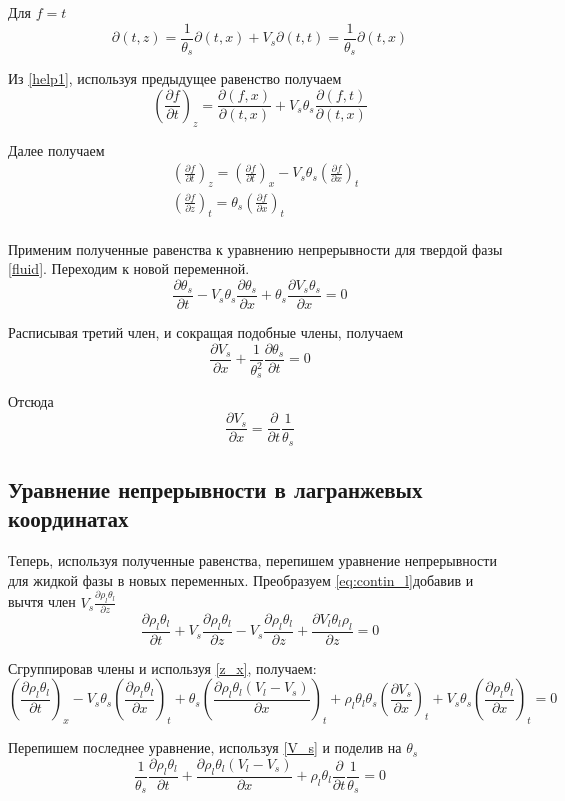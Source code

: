 \documentclass[12pt,a4paper]{article}
\newcommand{\pd}[2]{\frac{\partial #1}{\partial #2}}
\begin{document}
Для $ f = t $ 
$$
\partial(t , z) = \frac{1}{\theta_s} \partial(t , x) + V_s \partial(t , t) = \frac{1}{\theta_s} \partial(t , x)
$$

Из \eqref{help1}, используя предыдущее равенство получаем
$$
\left(\pd{f}{t}\right)_z = \pd{(f , x)}{(t , x)} + V_s \theta_s\pd{(f ,t)}{(t , x)}
$$

Далее получаем
\begin{equation}
\begin{aligned}
&\left(\pd{f}{t}\right)_z = \left(\pd{f}{t}\right)_x - V_s\theta_s\left(\pd{f}{x}\right)_t\\
&\left(\pd{f}{z}\right)_t = \theta_s\left(\pd{f}{x}\right)_t\\
\end{aligned}
\label{z_x}
\end{equation}

Применим полученные равенства к уравнению непрерывности для твердой фазы \eqref{fluid}. Переходим к новой переменной.
$$
\pd{\theta_s}{t} - V_s\theta_s\pd{\theta_s}{x} + \theta_s\pd{V_s\theta_s}{x} =0
$$

Расписывая третий член, и сокращая подобные члены, получаем
$$
\pd{V_s}{x} + \frac{1}{\theta_s^2}\pd{\theta_s}{t} = 0
$$

Отсюда
\begin{equation}
\pd{V_s}{x} = \pd{}{t}\frac{1}{\theta_s}
\label{V_s}
\end{equation}

\subsection{Уравнение непрерывности в лагранжевых координатах}
Теперь, используя полученные равенства, перепишем уравнение непрерывности для жидкой фазы в новых переменных. Преобразуем \eqref{eq:contin_l}добавив и вычтя член $V_s\pd{\rho_l\theta_l}{z} $
$$
\pd{\rho_l\theta_l}{t} + V_s\pd{\rho_l\theta_l}{z} - V_s\pd{\rho_l\theta_l}{z} + \pd{V_l\theta_l\rho_l}{z} =0
$$

Сгруппировав члены и используя \eqref{z_x}, получаем:
$$
\left(\pd{\rho_l\theta_l}{t}\right)_x - V_s\theta_s \left(\pd{\rho_l\theta_l}{x}\right)_t + \theta_s\left(\pd{\rho_l\theta_l(V_l - V_s)}{x}\right)_t + \rho_l\theta_l\theta_s\left(\pd{V_s}{x}\right)_t + V_s\theta_s \left(\pd{\rho_l\theta_l}{x}\right)_t = 0
$$

Перепишем последнее уравнение, используя \eqref{V_s} и поделив на $\theta_s$
$$
\frac{1}{\theta_s}\pd{\rho_l\theta_l}{t} + \pd{\rho_l\theta_l(V_l-V_s)}{x} + \rho_l\theta_l\pd{}{t}\frac{1}{\theta_s} = 0
$$
\end{document}

